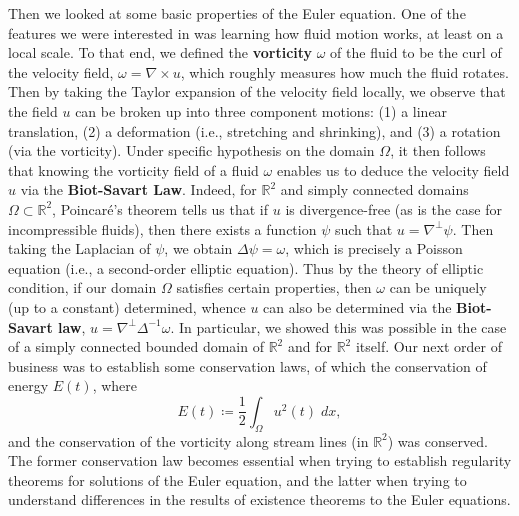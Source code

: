 \documentclass{article}
\begin{document}
	Then we looked at some basic properties of the Euler equation. One of the features we were interested in was learning how fluid motion works, at least on a local scale. To that end, we defined the \textbf{vorticity} $\omega$ of the fluid to be the curl of the velocity field, $\omega = \nabla \times u$, which roughly measures how much the fluid rotates. Then by taking the Taylor expansion of the velocity field locally, we observe that the field $u$ can be broken up into three component motions: (1) a linear translation, (2) a deformation (i.e., stretching and shrinking), and (3) a rotation (via the vorticity). Under specific hypothesis on the domain $\Omega$, it then follows that knowing the vorticity field of a fluid $\omega$ enables us to deduce the velocity field $u$ via the \textbf{Biot-Savart Law}. Indeed, for $\mathbb{R}^{2}$ and simply connected domains $\Omega \subset\mathbb{R}^{2}$, Poincar\'e's theorem tells us that if $u$ is divergence-free (as is the case for incompressible fluids), then there exists a function $\psi$ such that $u = \nabla^{\perp}\psi$. Then taking the Laplacian of $\psi$, we obtain $\Delta \psi = \omega$, which is precisely a Poisson equation (i.e., a second-order elliptic equation). Thus by the theory of elliptic condition, if our domain $\Omega$ satisfies certain properties, then $\omega$ can be uniquely (up to a constant) determined, whence $u$ can also be determined via the \textbf{Biot-Savart law}, $u = \nabla^{\perp}\Delta^{-1}\omega$. In particular, we showed this was possible in the case of a simply connected bounded domain of $\mathbb{R}^{2}$ and for $\mathbb{R}^{2}$ itself. Our next order of business was to establish some conservation laws, of which the conservation of energy $E(t)$, where 
	\begin{equation*}
		E(t) \coloneqq \frac{1}{2}\int_{\Omega}u^{2}(t)\;dx, 
	\end{equation*} 
	and the conservation of the vorticity along stream lines (in $\mathbb{R}^{2}$) was conserved. The former conservation law becomes essential when trying to establish regularity theorems for solutions of the Euler equation, and the latter when trying to understand differences in the results of existence theorems to the Euler equations. 
	
\end{document}
